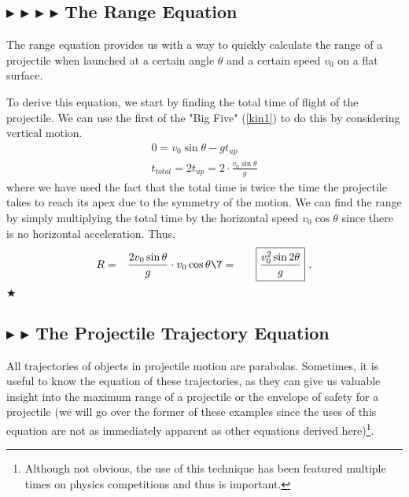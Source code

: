 %
%
\subsection{\color{OrangeRed} $\blacktriangleright$ \color{PineGreen} $\blacktriangleright$ \color{Goldenrod} $\blacktriangleright$ \color{Orchid} $\blacktriangleright$ \color{black} The Range Equation}

\noindent The range equation provides us with a way to quickly calculate the range of a projectile when launched at a certain angle $\theta$ and a certain speed $v_0$ on a flat surface.

\noindent To derive this equation, we start by finding the total time of flight of the projectile. We can use the first of the "Big Five" (\ref{kin1}) to do this by considering vertical motion.
\begin{gather}
0 = v_0 \sin \theta - gt_{up} \\
t_{total} = 2t_{up} = 2\cdot \frac{v_0 \sin{\theta}}{g}
\end{gather}
\noindent where we have used the fact that the total time is twice the time the projectile takes to reach its apex due to the symmetry of the motion. We can find the range by simply multiplying the total time by the horizontal speed $v_0 \cos \theta$ since there is no horizontal acceleration. Thus,
\begin{align}
    R =&\quad \frac{2v_0 \sin{\theta}}{g} \cdot v_0 \cos \theta \7
    =&\quad \boxed{\frac{v_0^2 \sin{2\theta}}{g}} \text{ .}
\end{align}
$\bigstar$


%
%
\subsection{\color{Goldenrod} $\blacktriangleright$ \color{Orchid} $\blacktriangleright$ \color{black} The Projectile Trajectory Equation}
\noindent All trajectories of objects in projectile motion are parabolas. Sometimes, it is useful to know the equation of these trajectories, as they can give us valuable insight into the maximum range of a projectile or the envelope of safety for a projectile (we will go over the former of these examples since the uses of this equation are not as immediately apparent as other equations derived here)\footnote{Although not obvious, the use of this technique has been featured multiple times on physics competitions and thus is important.}.

